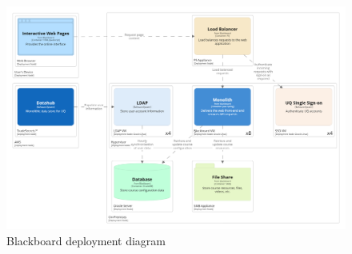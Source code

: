 \documentclass{csse4400}
\begin{document}
\begin{figure}
\begin{adjustwidth}{-11mm}{-11mm}
\centering
\includegraphics[width=0.98\paperwidth]{images/deployment}
\caption{Blackboard deployment diagram}
\end{adjustwidth}
\end{figure}
\end{document}
